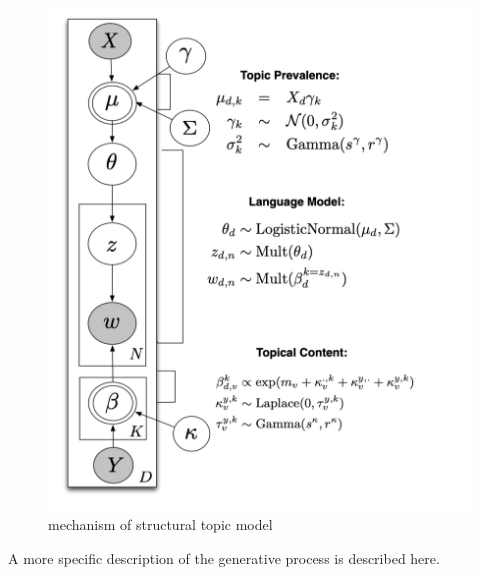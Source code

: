 \documentclass{article}
\begin{document}
 
 \begin{figure}[hbt]
  \includegraphics{pics/stm-explain-1.png}
  \caption{mechanism of structural topic model}
\end{figure}

 
 
 
 
A more specific description of the generative process is described here.
\end{document}
